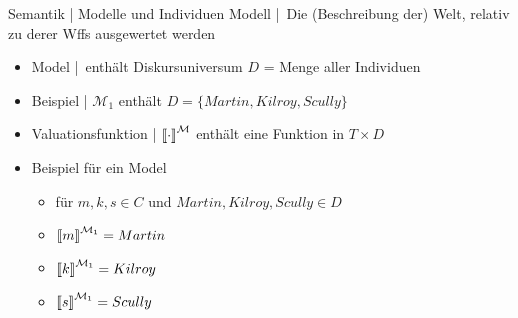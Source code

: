 \begin{frame}
  {Semantik | Modelle und Individuen}
  \onslide<+->
  \onslide<+->
  \alert{Modell} | Die (Beschreibung der) Welt, relativ zu derer Wffs ausgewertet werden\\
  \Halbzeile
  \begin{itemize}[<+->]
    \item \alert{Model} \Model | enthält \alert{Diskursuniversum} $D$ = Menge aller Individuen
    \item Beispiel | ${\mathcal M}_1$ enthält $D=\{Martin,Kilroy,Scully\}$
      \Halbzeile
    \item \alert{Valuationsfunktion} | ${\llbracket{}\cdot\rrbracket}^{\mathcal{M}}$ enthält eine Funktion in $T\times D$
      \Viertelzeile
    \item Beispiel für ein Model \Model{}
      \begin{itemize}[<+->]
        \item für $m,k,s\in C$ und $Martin, Kilroy, Scully\in D$
        \item ${\llbracket{}m\rrbracket}^{\mathcal{M}_1}=Martin$
        \item ${\llbracket{}k\rrbracket}^{\mathcal{M}_1}=Kilroy$
        \item ${\llbracket{}s\rrbracket}^{\mathcal{M}_1}=Scully$
      \end{itemize}
  \end{itemize}
\end{frame}

